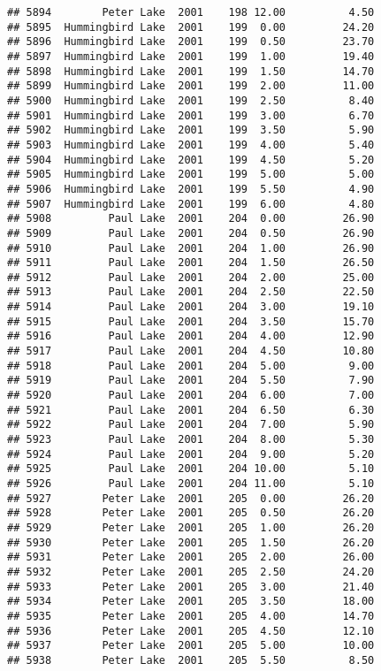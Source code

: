 \documentclass[
]{article}
\begin{document}
\begin{verbatim}
## 5894        Peter Lake  2001    198 12.00          4.50
## 5895  Hummingbird Lake  2001    199  0.00         24.20
## 5896  Hummingbird Lake  2001    199  0.50         23.70
## 5897  Hummingbird Lake  2001    199  1.00         19.40
## 5898  Hummingbird Lake  2001    199  1.50         14.70
## 5899  Hummingbird Lake  2001    199  2.00         11.00
## 5900  Hummingbird Lake  2001    199  2.50          8.40
## 5901  Hummingbird Lake  2001    199  3.00          6.70
## 5902  Hummingbird Lake  2001    199  3.50          5.90
## 5903  Hummingbird Lake  2001    199  4.00          5.40
## 5904  Hummingbird Lake  2001    199  4.50          5.20
## 5905  Hummingbird Lake  2001    199  5.00          5.00
## 5906  Hummingbird Lake  2001    199  5.50          4.90
## 5907  Hummingbird Lake  2001    199  6.00          4.80
## 5908         Paul Lake  2001    204  0.00         26.90
## 5909         Paul Lake  2001    204  0.50         26.90
## 5910         Paul Lake  2001    204  1.00         26.90
## 5911         Paul Lake  2001    204  1.50         26.50
## 5912         Paul Lake  2001    204  2.00         25.00
## 5913         Paul Lake  2001    204  2.50         22.50
## 5914         Paul Lake  2001    204  3.00         19.10
## 5915         Paul Lake  2001    204  3.50         15.70
## 5916         Paul Lake  2001    204  4.00         12.90
## 5917         Paul Lake  2001    204  4.50         10.80
## 5918         Paul Lake  2001    204  5.00          9.00
## 5919         Paul Lake  2001    204  5.50          7.90
## 5920         Paul Lake  2001    204  6.00          7.00
## 5921         Paul Lake  2001    204  6.50          6.30
## 5922         Paul Lake  2001    204  7.00          5.90
## 5923         Paul Lake  2001    204  8.00          5.30
## 5924         Paul Lake  2001    204  9.00          5.20
## 5925         Paul Lake  2001    204 10.00          5.10
## 5926         Paul Lake  2001    204 11.00          5.10
## 5927        Peter Lake  2001    205  0.00         26.20
## 5928        Peter Lake  2001    205  0.50         26.20
## 5929        Peter Lake  2001    205  1.00         26.20
## 5930        Peter Lake  2001    205  1.50         26.20
## 5931        Peter Lake  2001    205  2.00         26.00
## 5932        Peter Lake  2001    205  2.50         24.20
## 5933        Peter Lake  2001    205  3.00         21.40
## 5934        Peter Lake  2001    205  3.50         18.00
## 5935        Peter Lake  2001    205  4.00         14.70
## 5936        Peter Lake  2001    205  4.50         12.10
## 5937        Peter Lake  2001    205  5.00         10.00
## 5938        Peter Lake  2001    205  5.50          8.50

\end{verbatim}
\end{document}
